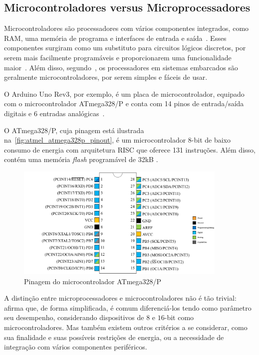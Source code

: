 \subsection{Microcontroladores versus Microprocessadores}

Microcontroladores são processadores com vários componentes integrados, como RAM, uma memória de programa e interfaces de entrada e saída~\cite{white:2011}. Esses componentes surgiram como um substituto para circuitos lógicos discretos, por serem mais facilmente programáveis e proporcionarem uma funcionalidade maior~\cite{heath:2002}. Além disso, segundo~, os processadores em sistemas embarcados são geralmente microcontroladores, por serem simples e fáceis de usar.

O Arduino Uno Rev3, por exemplo, é um placa de microcontrolador, equipado com o microcontrolador ATmega328/P e conta com 14 pinos de entrada/saída digitais e 6 entradas analógicas~\cite{arduino:uno_store}.

O ATmega328/P, cuja pinagem está ilustrada na~\autoref{fig:atmel_atmega328p_pinout}, é um microcontrolador 8-bit de baixo consumo de energia com arquitetura RISC que oferece 131 instruções. Além disso, contém uma memória \textit{flash} programável de 32kB \cite{atmel:2016atmega328p}.

\begin{figure}[ht]
	\caption{\label{fig:atmel_atmega328p_pinout}Pinagem do microcontrolador ATmega328/P}
	\begin{center}
	    \includegraphics[width=0.9\textwidth]{resources/atmel_atmega328_pinout}
	\end{center}
\end{figure}

A distinção entre microprocessadores e microcontroladores não é tão trivial:~ afirma que, de forma simplificada, é comum diferenciá-los tendo como parâmetro seu desempenho, considerando dispositivos de $8$ e $16$-bit como microcontroladores. Mas também existem outros critérios a se considerar, como sua finalidade e suas possíveis restrições de energia, ou a necessidade de integração com vários componentes periféricos.

